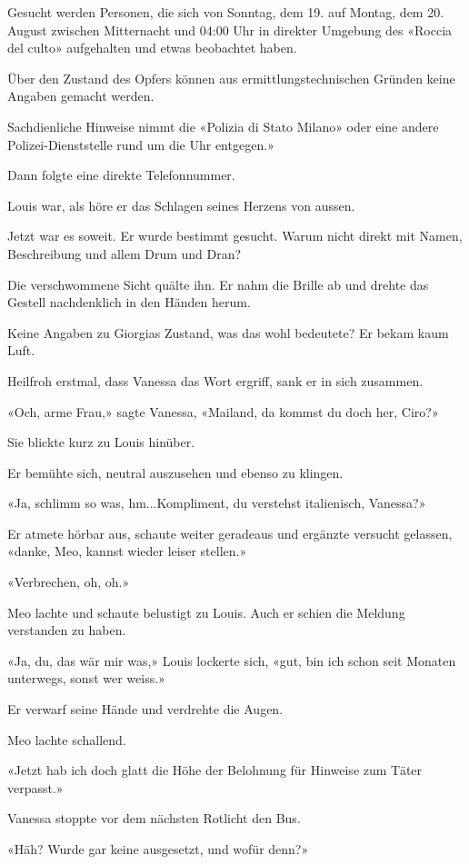 Gesucht werden Personen, die sich von Sonntag, dem 19. auf Montag, dem
20. August zwischen Mitternacht und 04:00 Uhr in direkter Umgebung des
«Roccia del culto» aufgehalten und etwas beobachtet haben.

Über den Zustand des Opfers können aus ermittlungstechnischen Gründen
keine Angaben gemacht werden.

Sachdienliche Hinweise nimmt die «Polizia di Stato Milano» oder eine
andere Polizei-Dienststelle rund um die Uhr entgegen.»

Dann folgte eine direkte Telefonnummer.

Louis war, als höre er das Schlagen seines Herzens von aussen.

Jetzt war es soweit. Er wurde bestimmt gesucht. Warum nicht direkt mit
Namen, Beschreibung und allem Drum und Dran?

Die verschwommene Sicht quälte ihn. Er nahm die Brille ab und drehte das
Gestell nachdenklich in den Händen herum.

Keine Angaben zu Giorgias Zustand, was das wohl bedeutete? Er bekam kaum
Luft.

Heilfroh erstmal, dass Vanessa das Wort ergriff, sank er in sich
zusammen.

«Och, arme Frau,» sagte Vanessa, «Mailand, da kommst du doch her, Ciro?»

Sie blickte kurz zu Louis hinüber.

Er bemühte sich, neutral auszusehen und ebenso zu klingen.

«Ja, schlimm so was, hm...Kompliment, du verstehst italienisch,
Vanessa?»

Er atmete hörbar aus, schaute weiter geradeaus und ergänzte versucht
gelassen, «danke, Meo, kannst wieder leiser stellen.»

«Verbrechen, oh, oh.»

Meo lachte und schaute belustigt zu Louis. Auch er schien die Meldung
verstanden zu haben.

«Ja, du, das wär mir was,» Louis lockerte sich, «gut, bin ich schon seit
Monaten unterwegs, sonst wer weiss.»

Er verwarf seine Hände und verdrehte die Augen.

Meo lachte schallend.

«Jetzt hab ich doch glatt die Höhe der Belohnung für Hinweise zum Täter
verpasst.»

Vanessa stoppte vor dem nächsten Rotlicht den Bus.

«Häh? Wurde gar keine ausgesetzt, und wofür denn?»

